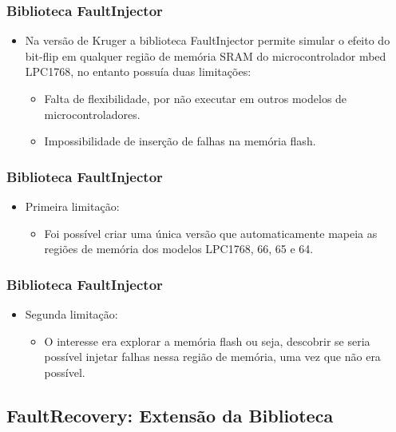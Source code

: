 \begin{frame}
	\frametitle{Biblioteca FaultInjector}	
		\begin{itemize}
			\item Na versão de Kruger a biblioteca FaultInjector permite simular o efeito do bit-flip em qualquer região de memória SRAM do microcontrolador mbed LPC1768, no entanto possuía duas limitações:
						
			\begin{itemize}
				\item Falta de flexibilidade, por não executar em outros modelos de microcontroladores.
				\item Impossibilidade de inserção de falhas na memória flash.
			\end{itemize}			
		\end{itemize}
\end{frame}

\begin{frame}
	\frametitle{Biblioteca FaultInjector}	
	\begin{itemize}
		\item Primeira limitação:
		\begin{itemize}			
			\item Foi possível criar uma única versão que automaticamente mapeia as
			regiões de memória dos modelos LPC1768, 66, 65 e 64.
		\end{itemize}
	\end{itemize}
\end{frame}

\begin{frame}
	\frametitle{Biblioteca FaultInjector}	
	\begin{itemize}
		\item Segunda limitação:
		\begin{itemize}			
			\item O interesse era explorar a memória flash ou seja, descobrir se seria possível injetar falhas nessa região de memória, uma vez que não era possível.
		\end{itemize}
	\end{itemize}	
	
\end{frame}

\subsection{FaultRecovery: Extensão da Biblioteca}

